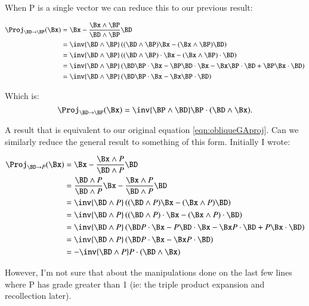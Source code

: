 \documentclass{article}      %
\begin{document}
When P is a single vector we can reduce this to our previous result:

\begin{align*}
\Proj_{\BD \rightarrow \BP}(\Bx) 
&= \Bx - \frac{\Bx \wedge \BP}{\BD \wedge \BP} \BD \\
&= \inv{\BD \wedge \BP} \left((\BD \wedge \BP)\Bx - (\Bx \wedge \BP) \BD \right) \\
&= \inv{\BD \wedge \BP} \left( (\BD \wedge \BP) \cdot \Bx - (\Bx \wedge \BP)  \cdot \BD \right) \\
&= \inv{\BD \wedge \BP} \left( \BD \BP \cdot \Bx -\BP \BD \cdot \Bx -\Bx \BP \cdot \BD +\BP \Bx \cdot \BD \right) \\
&= \inv{\BD \wedge \BP} \left( \BD \BP \cdot \Bx -\Bx \BP \cdot \BD \right) \\
\end{align*}

Which is:
\begin{equation}\label{eqn:followup}
\Proj_{\BD \rightarrow \BP}(\Bx) 
= \inv{\BP \wedge \BD} \BP \cdot ( \BD \wedge \Bx ).
\end{equation}

A result that is equivalent to our original equation \ref{eqn:obliqueGAproj}.  Can we similarly reduce the general result to something of this form.  Initially I wrote:

\begin{align*}
\Proj_{\BD \rightarrow P}(\Bx) 
&= \Bx - \frac{\Bx \wedge P}{\BD \wedge P} \BD \\
&= \frac{\BD \wedge P}{\BD \wedge P} \Bx - \frac{\Bx \wedge P}{\BD \wedge P} \BD \\
&= \inv{\BD \wedge P} \left( (\BD \wedge P) \Bx - (\Bx \wedge P) \BD \right) \\
&= \inv{\BD \wedge P} \left( (\BD \wedge P) \cdot \Bx - (\Bx \wedge P) \cdot \BD \right) \\
&= \inv{\BD \wedge P} \left( \BD P \cdot \Bx -P \BD \cdot \Bx - \Bx P \cdot \BD + P \Bx \cdot \BD \right) \\
&= \inv{\BD \wedge P} \left( \BD P \cdot \Bx - \Bx P \cdot \BD \right) \\ 
&= -\inv{\BD \wedge P} P \cdot (\BD \wedge \Bx ) \\
\end{align*}

However, I'm not sure that about the manipulations done on the last few lines where P has grade greater than 1 (ie: the triple product expansion and recollection later).
\end{document}
